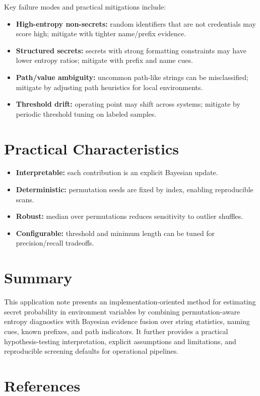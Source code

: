 \documentclass[10pt]{article}
\begin{document}
Key failure modes and practical mitigations include:
\begin{itemize}
  \item \textbf{High-entropy non-secrets:} random identifiers that are not credentials may score high; mitigate with tighter name/prefix evidence.
  \item \textbf{Structured secrets:} secrets with strong formatting constraints may have lower entropy ratios; mitigate with prefix and name cues.
  \item \textbf{Path/value ambiguity:} uncommon path-like strings can be misclassified; mitigate by adjusting path heuristics for local environments.
  \item \textbf{Threshold drift:} operating point may shift across systems; mitigate by periodic threshold tuning on labeled samples.
\end{itemize}

\section*{Practical Characteristics}

\begin{itemize}
  \item \textbf{Interpretable:} each contribution is an explicit Bayesian update.
  \item \textbf{Deterministic:} permutation seeds are fixed by index, enabling reproducible scans.
  \item \textbf{Robust:} median over permutations reduces sensitivity to outlier shuffles.
  \item \textbf{Configurable:} threshold and minimum length can be tuned for precision/recall tradeoffs.
\end{itemize}

\section*{Summary}

This application note presents an implementation-oriented method for estimating secret probability in environment variables by combining permutation-aware entropy diagnostics with Bayesian evidence fusion over string statistics, naming cues, known prefixes, and path indicators. It further provides a practical hypothesis-testing interpretation, explicit assumptions and limitations, and reproducible screening defaults for operational pipelines.

\section*{References}
\end{document}
